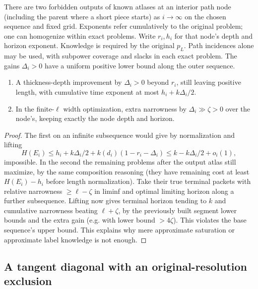 \begin{lemma}\label{a03:excluded-improvements}
There are two forbidden outputs of known atlases at an interior path node (including the parent where a short piece starts) as \(i\to\infty\) on the chosen sequence and fixed grid. Exponents refer cumulatively to the original problem; one can homogenize within exact problems. Write \(r_i,h_i\) for that node's depth and horizon exponent. Knowledge is required by the original \(p_L\).  Path incidences alone
may be used, with subpower coverage and slacks in each exact problem.
The gains \(\Delta_i>0\) have a uniform positive lower bound along
the outer sequence.
\begin{enumerate}
\item A thickness-depth improvement by \(\Delta_i>0\) beyond \(r_i\), still leaving positive length, with cumulative time exponent at most \(h_i+k\Delta_i/2\).
\item In the finite-\(\ell\) width optimization, extra narrowness by \(\Delta_i\gg\zeta>0\) over the node's, keeping exactly the node depth and horizon.

\end{enumerate}
\end{lemma}
\begin{proof}
The first on an infinite subsequence would give by normalization and lifting
\begin{equation}
H(E_i)\le h_i+k\Delta_i/2+k(d_i)(1-r_i-\Delta_i)\le k-k\Delta_i/2+o_i(1),
\end{equation}
impossible. In the second the remaining problems after the output atlas still maximize, by the same composition reasoning (they have remaining cost at least \(H(E_i)-h_i\) before length normalization). Take their true terminal packets with relative narrowness \(\ge\ell-\zeta\) in liminf and optimal limiting horizon along a further subsequence. Lifting now gives terminal horizon tending to \(k\) and cumulative narrowness beating \(\ell+\zeta\), by the previously built segment lower bounds and the extra gain (e.g. with lower bound \(>4\zeta\)). This violates the base sequence's upper bound. This explains why mere approximate saturation or approximate label knowledge is not enough.

\end{proof}

\subsection{A tangent diagonal with an original-resolution exclusion}

